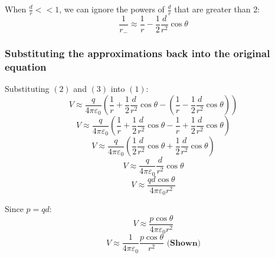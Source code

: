 \documentclass[11pt]{article}
\begin{document}
When \(\frac{d}{r} << 1\), we can ignore the powers of \(\frac{d}{r}\) that are greater than 2:
\[\frac{1}{r_-} \approx \frac{1}{r} - \frac{1}{2} \frac{d}{r^2} \cos \theta \tag{3}\]

\newpage

\subsubsection{Substituting the approximations back into the original equation}
\label{sec:org68fe7ed}
Substituting \((2)\) and \((3)\) into \((1)\):
\[V \approx \frac{q}{4 \pi \varepsilon_0} \left( \frac{1}{r} + \frac{1}{2} \frac{d}{r^2} \cos \theta - \left(\frac{1}{r} - \frac{1}{2} \frac{d}{r^2} \cos \theta \right) \right)\]
\[V \approx \frac{q}{4 \pi \varepsilon_0} \left( \frac{1}{r} + \frac{1}{2} \frac{d}{r^2} \cos \theta - \frac{1}{r} + \frac{1}{2} \frac{d}{r^2} \cos \theta \right)\]
\[V \approx \frac{q}{4 \pi \varepsilon_0} \left(\frac{1}{2} \frac{d}{r^2} \cos \theta + \frac{1}{2} \frac{d}{r^2} \cos \theta \right)\]
\[V \approx \frac{q}{4 \pi \varepsilon_0} \frac{d}{r^2} \cos \theta\]
\[V \approx \frac{qd \cos \theta}{4 \pi \varepsilon_0 r^2}\]

Since \(p = qd\):
\[V \approx \frac{p \cos \theta}{4 \pi \varepsilon_0 r^2}\]
\[V \approx \frac{1}{4 \pi \varepsilon_0} \frac{p \cos \theta}{r^2} \textbf{ (Shown)}\]
\end{document}

